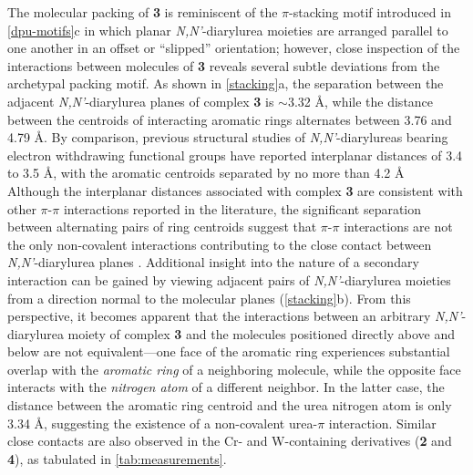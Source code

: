 The molecular packing of \textbf{3} is reminiscent of the $\pi$-stacking motif introduced in \autoref{dpu-motifs}c in which planar \textit{N,N'}-diarylurea moieties are arranged parallel to one another in an offset or “slipped” orientation; however, close inspection of the interactions between molecules of \textbf{3} reveals several subtle deviations from the archetypal packing motif. As shown in \autoref{stacking}a, the separation between the adjacent \textit{N,N'}-diarylurea planes of complex \textbf{3} is $\sim$3.32 \AA, while the distance between the centroids of interacting aromatic rings alternates between 3.76 and 4.79 \AA. By comparison, previous structural studies of \textit{N,N'}-diarylureas bearing electron withdrawing functional groups have reported interplanar distances of 3.4 to 3.5 \AA, with the aromatic centroids separated by no more than 4.2 \AA~ \citep{Reddy2007, Solomos2017a} Although the interplanar distances associated with complex \textbf{3} are consistent with other $\pi$-$\pi$ interactions reported in the literature, the significant separation between alternating pairs of ring centroids suggest that $\pi$-$\pi$ interactions are not the only non-covalent interactions contributing to the close contact between \textit{N,N'}-diarylurea planes \cite{Janiak2000}. Additional insight into the nature of a secondary interaction can be gained by viewing adjacent pairs of \textit{N,N'}-diarylurea moieties from a direction normal to the molecular planes (\autoref{stacking}b). From this perspective, it becomes apparent that the interactions between an arbitrary \textit{N,N'}-diarylurea moiety of complex \textbf{3} and the molecules positioned directly above and below are not equivalent---one face of the aromatic ring experiences substantial overlap with the \textit{aromatic ring} of a neighboring molecule, while the opposite face interacts with the \textit{nitrogen atom} of a different neighbor. In the latter case, the distance between the aromatic ring centroid and the urea nitrogen atom is only 3.34 \AA, suggesting the existence of a non-covalent urea-$\pi$ interaction. Similar close contacts are also observed in the Cr- and W-containing derivatives (\textbf{2} and \textbf{4}), as tabulated in \autoref{tab:measurements}.

